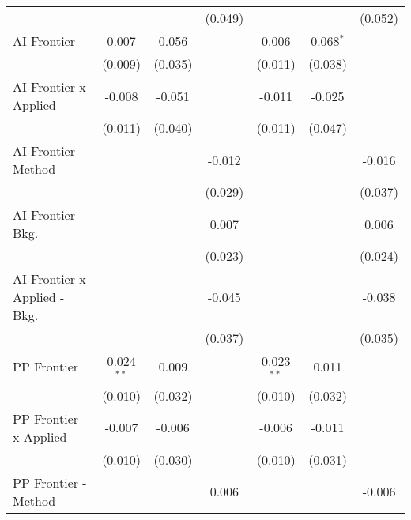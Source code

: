 \begin{tabular}{lcccccc}
                                  &                &                & (0.049)        &                &               & (0.052)\\   
   AI Frontier                    & 0.007          & 0.056          &                & 0.006          & 0.068$^{*}$   &   \\   
                                  & (0.009)        & (0.035)        &                & (0.011)        & (0.038)       &   \\   
   AI Frontier x Applied          & -0.008         & -0.051         &                & -0.011         & -0.025        &   \\   
                                  & (0.011)        & (0.040)        &                & (0.011)        & (0.047)       &   \\   
   AI Frontier - Method           &                &                & -0.012         &                &               & -0.016\\   
                                  &                &                & (0.029)        &                &               & (0.037)\\   
   AI Frontier - Bkg.             &                &                & 0.007          &                &               & 0.006\\   
                                  &                &                & (0.023)        &                &               & (0.024)\\   
   AI Frontier x Applied - Bkg.   &                &                & -0.045         &                &               & -0.038\\   
                                  &                &                & (0.037)        &                &               & (0.035)\\   
   PP Frontier                    & 0.024$^{**}$   & 0.009          &                & 0.023$^{**}$   & 0.011         &   \\   
                                  & (0.010)        & (0.032)        &                & (0.010)        & (0.032)       &   \\   
   PP Frontier x Applied          & -0.007         & -0.006         &                & -0.006         & -0.011        &   \\   
                                  & (0.010)        & (0.030)        &                & (0.010)        & (0.031)       &   \\   
   PP Frontier - Method           &                &                & 0.006          &                &               & -0.006\\   

\end{tabular}
